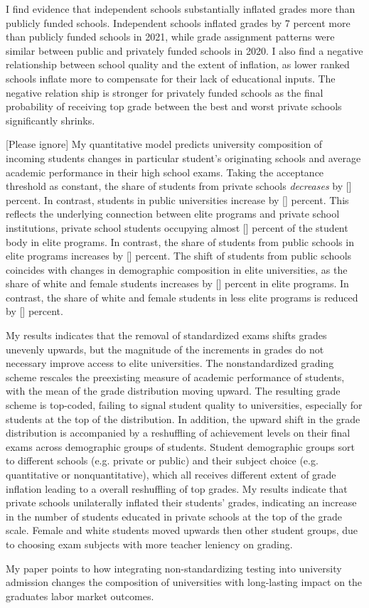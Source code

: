 I find evidence that independent schools substantially inflated grades more than publicly funded schools. Independent schools inflated grades by 7 percent more than publicly funded schools in 2021, while grade assignment patterns were similar between public and privately funded schools in 2020. I also find a negative relationship between school quality and the extent of inflation, as lower ranked schools inflate more to compensate for their lack of educational inputs. The negative relation ship is stronger for privately funded schools as the final probability of receiving top grade between the best and worst private schools significantly shrinks.

[Please ignore] My quantitative model predicts university composition of incoming students changes in particular student's originating schools and average academic performance in their high school exams. Taking the acceptance threshold as constant, the share of students from private schools \emph{decreases} by [] percent. In contrast, students in public universities increase by [] percent. This reflects the underlying connection between elite programs and private school institutions, private school students occupying almost [] percent of the student body in elite programs. In contrast, the share of students from public schools in elite programs increases by [] percent. The shift of students from public schools coincides with changes in demographic composition in elite universities, as the share of white and female students increases by [] percent in elite programs. In contrast, the share of white and female students in less elite programs is reduced by [] percent. 

My results indicates that the removal of standardized exams shifts grades unevenly upwards, but the magnitude of the increments in grades do not necessary improve access to elite universities. The nonstandardized grading scheme rescales the preexisting measure of academic performance of students, with the mean of the grade distribution moving upward. The resulting grade scheme is top-coded, failing to signal student quality to universities, especially for students at the top of the distribution. In addition, the upward shift in the grade distribution is accompanied by a reshuffling of achievement levels on their final exams across demographic groups of students. Student demographic groups sort to different schools (e.g. private or public) and their subject choice (e.g. quantitative or nonquantitative), which all receives different extent of grade inflation leading to a overall reshuffling of top grades. My results indicate that private schools unilaterally inflated their students' grades, indicating an increase in the number of students educated in private schools at the top of the grade scale. Female and white students moved upwards then other student groups, due to choosing exam subjects with more teacher leniency on grading. 

My paper points to how integrating non-standardizing testing into university admission changes the composition of universities with long-lasting impact on the graduates labor market outcomes.
\clearpage